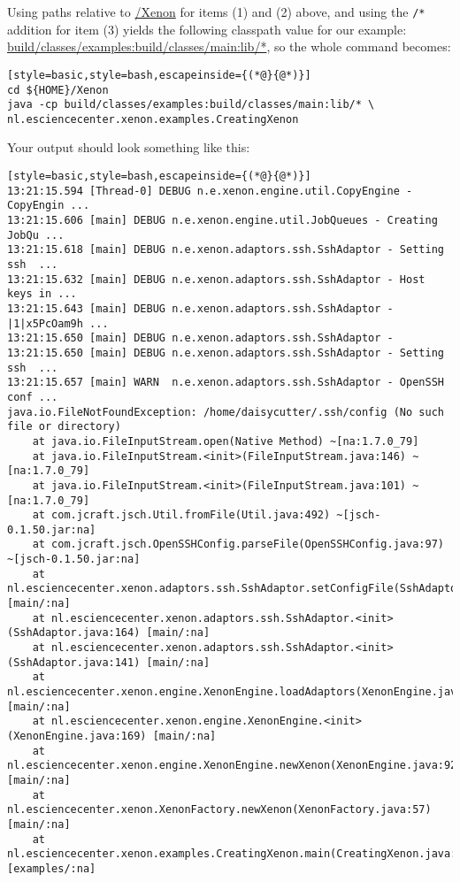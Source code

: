 {Using paths relative to \mytilde\url{/Xenon} for items (1) and (2) above, and using the \texttt{/*} addition for item (3) yields the following classpath value for our example: \url{build/classes/examples:build/classes/main:lib/*}, so the whole command becomes:
\begin{lstlisting}[style=basic,style=bash,escapeinside={(*@}{@*)}]
cd ${HOME}/Xenon
java -cp build/classes/examples:build/classes/main:lib/* \
nl.esciencecenter.xenon.examples.CreatingXenon
\end{lstlisting} %



Your output should look something like this:
\begin{lstlisting}[style=basic,style=bash,escapeinside={(*@}{@*)}]
13:21:15.594 [Thread-0] DEBUG n.e.xenon.engine.util.CopyEngine - CopyEngin ...
13:21:15.606 [main] DEBUG n.e.xenon.engine.util.JobQueues - Creating JobQu ...
13:21:15.618 [main] DEBUG n.e.xenon.adaptors.ssh.SshAdaptor - Setting ssh  ...
13:21:15.632 [main] DEBUG n.e.xenon.adaptors.ssh.SshAdaptor - Host keys in ...
13:21:15.643 [main] DEBUG n.e.xenon.adaptors.ssh.SshAdaptor - |1|x5PcOam9h ...
13:21:15.650 [main] DEBUG n.e.xenon.adaptors.ssh.SshAdaptor -
13:21:15.650 [main] DEBUG n.e.xenon.adaptors.ssh.SshAdaptor - Setting ssh  ...
13:21:15.657 [main] WARN  n.e.xenon.adaptors.ssh.SshAdaptor - OpenSSH conf ...
java.io.FileNotFoundException: /home/daisycutter/.ssh/config (No such file or directory)
    at java.io.FileInputStream.open(Native Method) ~[na:1.7.0_79]
    at java.io.FileInputStream.<init>(FileInputStream.java:146) ~[na:1.7.0_79]
    at java.io.FileInputStream.<init>(FileInputStream.java:101) ~[na:1.7.0_79]
    at com.jcraft.jsch.Util.fromFile(Util.java:492) ~[jsch-0.1.50.jar:na]
    at com.jcraft.jsch.OpenSSHConfig.parseFile(OpenSSHConfig.java:97) ~[jsch-0.1.50.jar:na]
    at nl.esciencecenter.xenon.adaptors.ssh.SshAdaptor.setConfigFile(SshAdaptor.java:192) [main/:na]
    at nl.esciencecenter.xenon.adaptors.ssh.SshAdaptor.<init>(SshAdaptor.java:164) [main/:na]
    at nl.esciencecenter.xenon.adaptors.ssh.SshAdaptor.<init>(SshAdaptor.java:141) [main/:na]
    at nl.esciencecenter.xenon.engine.XenonEngine.loadAdaptors(XenonEngine.java:182) [main/:na]
    at nl.esciencecenter.xenon.engine.XenonEngine.<init>(XenonEngine.java:169) [main/:na]
    at nl.esciencecenter.xenon.engine.XenonEngine.newXenon(XenonEngine.java:92) [main/:na]
    at nl.esciencecenter.xenon.XenonFactory.newXenon(XenonFactory.java:57) [main/:na]
    at nl.esciencecenter.xenon.examples.CreatingXenon.main(CreatingXenon.java:39) [examples/:na]

\end{lstlisting}}
